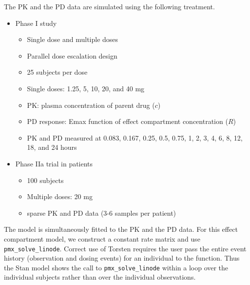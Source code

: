 \documentclass[10pt, reqno, oneside]{amsbook}
\numberwithin{equation}{chapter}
\numberwithin{figure}{chapter}
\numberwithin{table}{chapter}
\theoremstyle{remark}
\begin{document}
The PK and the PD data are simulated using the following
treatment.
\begin{itemize}
\item Phase I study
\begin{itemize}
\item Single dose and multiple doses
\item Parallel dose escalation design
\item 25 subjects per dose
\item Single doses: 1.25, 5, 10, 20, and 40 mg
\item PK: plasma concentration of parent drug (\(c\))
\item PD response: Emax function of effect compartment concentration (\(R\))
\item PK and PD measured at 0.083, 0.167, 0.25, 0.5, 0.75, 1, 2, 3, 4, 6, 8, 12, 18, and 24 hours
\end{itemize}
\item Phase IIa trial in patients
\begin{itemize}
\item 100 subjects
\item Multiple doses: 20 mg
\item sparse PK and PD data (3-6 samples per patient)
\end{itemize}
\end{itemize}

The model is simultaneously fitted to the PK and the PD
data. For this effect compartment model, we construct a
constant rate matrix and use \texttt{pmx\_solve\_linode}. Correct use of
Torsten requires the user pass the entire event history
(observation and dosing events) for an individual to the
function. Thus the Stan model shows the call to \texttt{pmx\_solve\_linode}
within a loop over the individual subjects rather than over
the individual observations.
\end{document}
